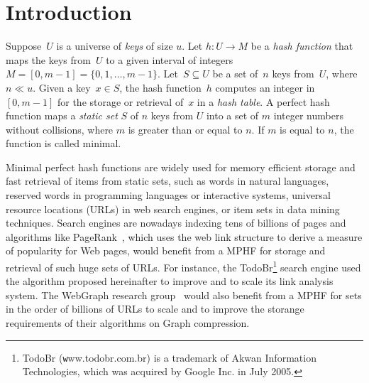 \section{Introduction}
\label{sec:intro}

\enlargethispage{2\baselineskip}
Suppose~$U$ is a universe of \textit{keys} of size $u$.
Let $h:U\to M$ be a {\em hash function} that maps the keys from~$U$
to a given interval of integers $M=[0,m-1]=\{0,1,\dots,m-1\}$.
Let~$S\subseteq U$ be a set of~$n$ keys from~$U$, where $ n \ll u$.
Given a key~$x\in S$, the hash function~$h$ computes an integer in
$[0,m-1]$ for the storage or retrieval of~$x$ in a {\em hash table}.
A perfect hash function maps a {\em static set} $S$ of $n$ keys from $U$ into a set of $m$ integer 
numbers without collisions, where $m$ is greater than or equal to $n$. 
If $m$ is equal to $n$, the function is called minimal. 

% 

Minimal perfect hash functions are widely used for memory efficient storage and fast 
retrieval of items from static sets, such as words in natural languages, 
reserved words in programming languages or interactive systems, universal resource 
locations (URLs) in web search engines, or item sets in data mining techniques. 
Search engines are nowadays indexing tens of billions of pages and algorithms
like PageRank~\cite{Brin1998}, which uses the web link structure to derive a
measure of popularity for Web pages, would benefit from a MPHF for storage and 
retrieval of such huge sets of URLs. 
For instance, the TodoBr\footnote{TodoBr ({\texttt www.todobr.com.br}) is a trademark of 
Akwan Information Technologies, which was acquired by Google Inc. in July 2005.}
search engine used the algorithm proposed hereinafter to 
improve and to scale its link analysis system. 
The WebGraph research group~\cite{bv04} would 
also benefit from a MPHF for sets in the order of billions of URLs to scale
and to improve the storange requirements of their algorithms on Graph compression. 

